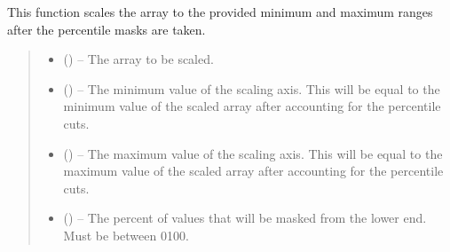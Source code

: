 \documentclass[letterpaper,11pt,english]{sphinxmanual}
\begin{document}

\begin{savenotes}\begin{fulllineitems}
\label{\detokenize{code/opihiexarata.library.image:opihiexarata.library.image.scale_image_array}}
\pysigstartsignatures
{}
\pysigstopsignatures
\sphinxAtStartPar
This function scales the array to the provided minimum and maximum
ranges after the percentile masks are taken.
\begin{quote}\begin{description}
\begin{itemize}
\item {} 
\sphinxAtStartPar
{} () – The array to be scaled.

\item {} 
\sphinxAtStartPar
{} () – The minimum value of the scaling axis. This will be equal to the
minimum value of the scaled array after accounting for the percentile
cuts.

\item {} 
\sphinxAtStartPar
{} () – The maximum value of the scaling axis. This will be equal to the
maximum value of the scaled array after accounting for the percentile
cuts.

\item {} 
\sphinxAtStartPar
{} () – The percent of values that will be masked from the lower end. Must be
between 0\sphinxhyphen{}100.


\end{itemize}
\end{description}
\end{quote}
\end{fulllineitems}
\end{savenotes}
\end{document}
